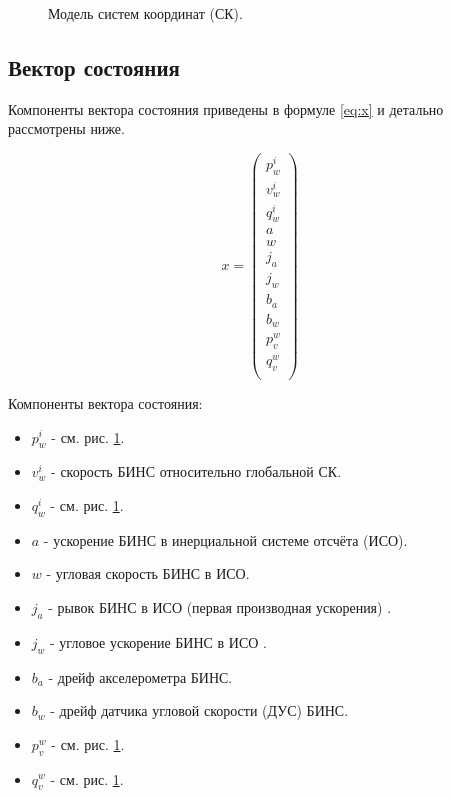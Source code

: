\documentclass[12pt,a4paper]{article}
\begin{document}
\begin{figure}[!h]
    \centering
    
    \caption{\label{fig:frames}Модель систем координат (СК).}
\end{figure}

\subsection{Вектор состояния}

Компоненты вектора состояния приведены в формуле \ref{eq:x} и детально рассмотрены ниже.

\begin{equation}
    \label{eq:x}
    x=\left(
    \begin{array}{c}
    p_w^i \\
    v_w^i \\
    q_w^i \\
    a \\
    w \\
    j_a \\
    j_w \\
    b_a \\
    b_w \\
    p_v^w \\
    q_v^w \\
    \end{array}
    \right)
\end{equation}

Компоненты вектора состояния:
\begin{itemize}
    \item $p_w^i$ - см. рис. \ref{fig:frames}.
    \item $v_w^i$ - скорость БИНС относительно глобальной СК.
    \item $q_w^i$ - см. рис. \ref{fig:frames}.
    \item $a$ - ускорение БИНС в инерциальной системе отсчёта (ИСО).
    \item $w$ - угловая скорость БИНС в ИСО.
    \item $j_a$ - рывок БИНС в ИСО (первая производная ускорения) \cite{Kishore94}.
    \item $j_w$ - угловое ускорение БИНС в ИСО \cite{Kishore94}.
    \item $b_a$ - дрейф акселерометра БИНС.
    \item $b_w$ - дрейф датчика угловой скорости (ДУС) БИНС.
    \item $p_v^w$ - см. рис. \ref{fig:frames}.
    \item $q_v^w$ - см. рис. \ref{fig:frames}.
\end{itemize}
\end{document}
